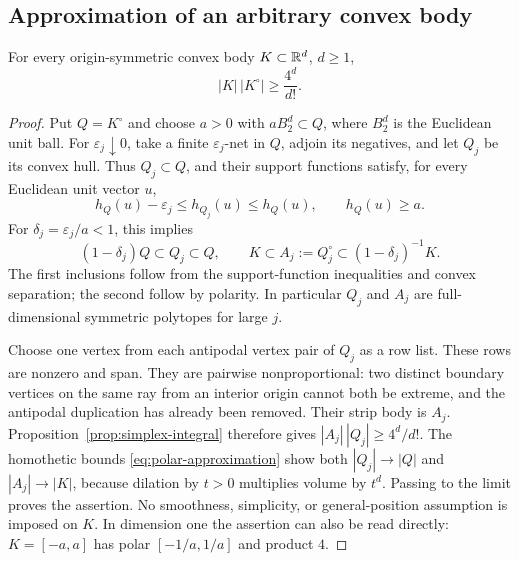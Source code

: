 \subsection{Approximation of an arbitrary convex body}

\begin{corollary}
\label{cor:symmetric-inequality}
For every origin-symmetric convex body $K\subset\mathbb R^d$, $d\geq1$,
\[
 |K|\,|K^\circ|\geq\frac{4^d}{d!}.
\]
\end{corollary}

\begin{proof}
Put $Q=K^\circ$ and choose $a>0$ with $aB_2^d\subset Q$,
where $B_2^d$ is the Euclidean unit ball.
For $\varepsilon_j\downarrow0$, take a finite $\varepsilon_j$-net in
$Q$, adjoin its negatives, and let $Q_j$ be its convex hull. Thus
$Q_j\subset Q$, and their support functions satisfy, for every Euclidean
unit vector $u$,
\[
 h_Q(u)-\varepsilon_j\leq h_{Q_j}(u)\leq h_Q(u),
 \qquad h_Q(u)\geq a.
\]
For $\delta_j=\varepsilon_j/a<1$, this implies
\begin{equation}\label{eq:polar-approximation}
 (1-\delta_j)Q\subset Q_j\subset Q,
 \qquad
 K\subset A_j:=Q_j^\circ\subset(1-\delta_j)^{-1}K.
\end{equation}
The first inclusions follow from the support-function inequalities and
convex separation; the second follow by polarity. In particular $Q_j$
and $A_j$ are full-dimensional symmetric polytopes for large $j$.

Choose one vertex from each antipodal vertex pair of $Q_j$ as a row
list. These rows are nonzero and span. They are pairwise
nonproportional: two distinct boundary vertices on the same ray from
an interior origin cannot both be extreme, and the antipodal duplication
has already been removed. Their strip body is $A_j$.
Proposition~\ref{prop:simplex-integral} therefore gives
$|A_j|\,|Q_j|\geq4^d/d!$.
The homothetic bounds \eqref{eq:polar-approximation} show both
$|Q_j|\to|Q|$ and $|A_j|\to|K|$, because dilation by $t>0$ multiplies
volume by $t^d$. Passing to the limit proves the assertion. No smoothness,
simplicity, or general-position assumption is imposed on $K$.
In dimension one the assertion can also be read directly:
$K=[-a,a]$ has polar $[-1/a,1/a]$ and product $4$.
\end{proof}
